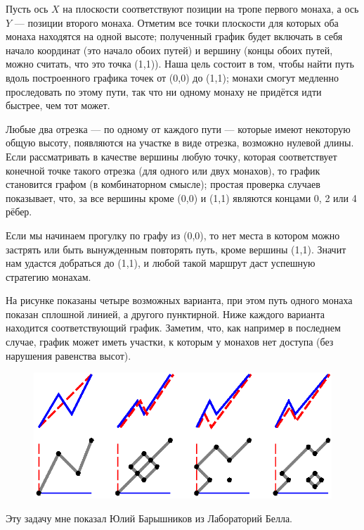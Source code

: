 Пусть ось $X$ на плоскости соответствуют позиции на тропе первого монаха, а ось $Y$ --- позиции второго монаха.
Отметим все точки плоскости для которых оба монаха находятся на одной высоте;
полученный график будет включать в себя начало координат (это начало обоих путей) и вершину (концы обоих путей, можно считать, что это точка (1,1)).
Наша цель состоит в том, чтобы найти путь вдоль построенного графика точек от (0,0) до (1,1);
монахи смогут медленно проследовать по этому пути, так что ни одному монаху не придётся идти быстрее, чем тот может.

Любые два отрезка --- по одному от каждого пути --- которые имеют некоторую общую высоту, появляются на участке в виде отрезка, возможно нулевой длины.
Если рассматривать в качестве вершины любую точку, которая соответствует конечной точке такого отрезка (для одного или двух монахов), то график становится графом (в комбинаторном смысле);
простая проверка случаев показывает, что, за все вершины кроме (0,0) и (1,1) являются концами 0, 2 или 4 рёбер.

Если мы начинаем прогулку по графу из (0,0), то нет места в котором можно застрять или быть вынужденным повторять путь, кроме вершины (1,1).
Значит нам удастся добраться до (1,1), и любой такой маршрут даст успешную стратегию монахам.
\heart

На рисунке показаны четыре возможных варианта, при этом путь одного монаха показан сплошной линией, а другого пунктирной.
Ниже каждого варианта находится соответствующий график.
Заметим, что, как например в последнем случае, график может иметь участки, к которым у монахов нет доступа (без нарушения равенства высот).

\begin{figure}[h!]
\centering
\includegraphics[scale=0.9]{Figs/Toughies/monks}
\end{figure} 

Эту задачу мне показал Юлий Барышников из Лабораторий Белла.

